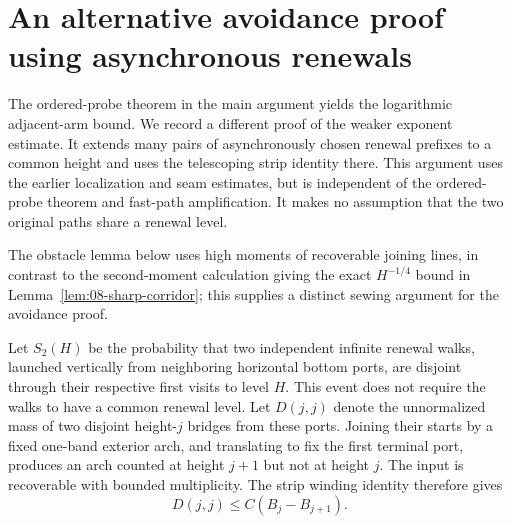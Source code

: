 \section{An alternative avoidance proof using asynchronous renewals}\label{sec:asynchronous}
The ordered-probe theorem in the main argument yields the logarithmic
adjacent-arm bound. We record a different proof of the weaker exponent
estimate. It extends many pairs of asynchronously chosen renewal prefixes
to a common height and uses the telescoping strip identity there. This
argument uses the earlier localization and seam estimates, but is
independent of the ordered-probe theorem and fast-path amplification.
It makes no assumption that the two original paths share a renewal level.



The obstacle lemma below uses high moments of recoverable joining lines,
in contrast to the second-moment calculation giving the exact
\(H^{-1/4}\) bound in Lemma~\ref{lem:08-sharp-corridor}; this supplies a distinct
sewing argument for the avoidance proof.

Let \(S_2(H)\) be the probability that two independent infinite renewal
walks, launched vertically from neighboring horizontal bottom ports,
are disjoint through their respective first visits to level \(H\).
This event does not require the walks to have a common renewal level.
Let \(D(j,j)\) denote the unnormalized mass of two disjoint height-\(j\)
bridges from these ports.  Joining their starts by a fixed one-band
exterior arch, and translating to fix the first terminal port, produces
an arch counted at height \(j+1\) but not at height \(j\).  The input
is recoverable with bounded multiplicity.  The strip winding identity
therefore gives
\begin{equation}
                  D(j,j)\le C(B_j-B_{j+1}).          \label{eq:09-diagonal}
\end{equation}

